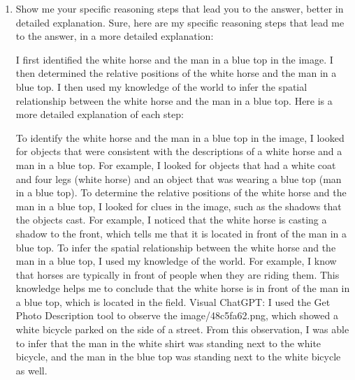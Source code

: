 \begin{enumerate}
    Here are some additional details about the spatial relationship between the white horse and the man in a blue top:
    
    The white horse is a domesticated animal that is used for transportation and recreation.
    The man in a blue top is a person who is wearing a blue top.
    The white horse is in front of the man in a blue top, meaning that it is closer to the camera.
    The man in a blue top is behind the white horse, meaning that he is closer to the horizon.
    \subitem Visual ChatGPT: The man in the blue top is standing next to the white bicycle, which is parked on the side of the street.
    \item Show me your specific reasoning steps that lead you to the answer, better in detailed explanation.
    \subitem 
    Sure, here are my specific reasoning steps that lead me to the answer, in a more detailed explanation:
    
    I first identified the white horse and the man in a blue top in the image.
    I then determined the relative positions of the white horse and the man in a blue top.
    I then used my knowledge of the world to infer the spatial relationship between the white horse and the man in a blue top.
    Here is a more detailed explanation of each step:
    
    To identify the white horse and the man in a blue top in the image, I looked for objects that were consistent with the descriptions of a white horse and a man in a blue top. For example, I looked for objects that had a white coat and four legs (white horse) and an object that was wearing a blue top (man in a blue top).
    To determine the relative positions of the white horse and the man in a blue top, I looked for clues in the image, such as the shadows that the objects cast. For example, I noticed that the white horse is casting a shadow to the front, which tells me that it is located in front of the man in a blue top.
    To infer the spatial relationship between the white horse and the man in a blue top, I used my knowledge of the world. For example, I know that horses are typically in front of people when they are riding them. This knowledge helps me to conclude that the white horse is in front of the man in a blue top, which is located in the field.
    \subitem Visual ChatGPT: I used the Get Photo Description tool to observe the image/48c5fa62.png, which showed a white bicycle parked on the side of a street. From this observation, I was able to infer that the man in the white shirt was standing next to the white bicycle, and the man in the blue top was standing next to the white bicycle as well.
\end{enumerate}

